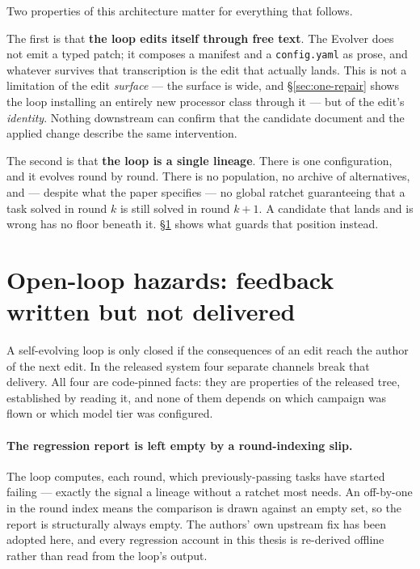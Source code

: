 Two properties of this architecture matter for everything that follows.

The first is that \textbf{the loop edits itself through free text}. The
Evolver does not emit a typed patch; it composes a manifest and a
\texttt{config.yaml} as prose, and whatever survives that transcription is
the edit that actually lands. This is not a limitation of the edit
\emph{surface} --- the surface is wide, and \S\ref{sec:one-repair} shows
the loop installing an entirely new processor class through it --- but of
the edit's \emph{identity}. Nothing downstream can confirm that the
candidate document and the applied change describe the same intervention.

The second is that \textbf{the loop is a single lineage}. There is one
configuration, and it evolves round by round. There is no population, no
archive of alternatives, and --- despite what the paper specifies --- no
global ratchet guaranteeing that a task solved in round $k$ is still solved
in round $k+1$. A candidate that lands and is wrong has no floor beneath
it. \S\ref{sec:open-loop} shows what guards that position instead.

\section{Open-loop hazards: feedback written but not delivered}
\label{sec:open-loop}

A self-evolving loop is only closed if the consequences of an edit reach
the author of the next edit. In the released system four separate channels
break that delivery. All four are code-pinned facts: they are properties of
the released tree, established by reading it, and none of them depends on
which campaign was flown or which model tier was configured.

\paragraph{The regression report is left empty by a round-indexing slip.}
The loop computes, each round, which previously-passing tasks have started
failing --- exactly the signal a lineage without a ratchet most needs. An
off-by-one in the round index means the comparison is drawn against an
empty set, so the report is structurally always empty. The authors' own
upstream fix has been adopted here, and every regression account in this
thesis is re-derived offline rather than read from the loop's output.

